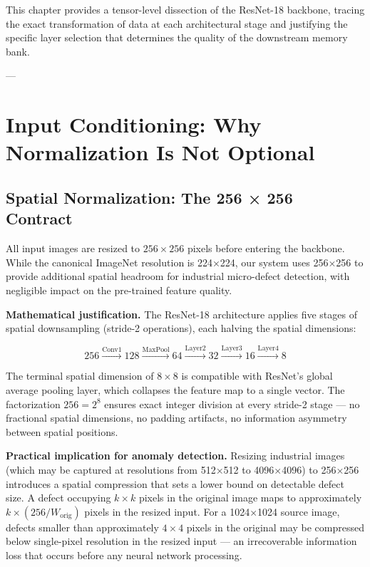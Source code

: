 \documentclass[12pt,a4paper,oneside]{report}
\begin{document}
This chapter provides a tensor-level dissection of the ResNet-18 backbone, tracing the exact transformation of data at each architectural stage and justifying the specific layer selection that determines the quality of the downstream memory bank.

---

\section{Input Conditioning: Why Normalization Is Not Optional}

\subsection{Spatial Normalization: The 256 × 256 Contract}

All input images are resized to $256 \times 256$ pixels before entering the backbone. While the canonical ImageNet resolution is 224×224, our system uses 256×256 to provide additional spatial headroom for industrial micro-defect detection, with negligible impact on the pre-trained feature quality.

\textbf{Mathematical justification.} The ResNet-18 architecture applies five stages of spatial downsampling (stride-2 operations), each halving the spatial dimensions:

$$256 \xrightarrow{\text{Conv1}} 128 \xrightarrow{\text{MaxPool}} 64 \xrightarrow{\text{Layer2}} 32 \xrightarrow{\text{Layer3}} 16 \xrightarrow{\text{Layer4}} 8$$

The terminal spatial dimension of $8 \times 8$ is compatible with ResNet's global average pooling layer, which collapses the feature map to a single vector. The factorization $256 = 2^8$ ensures exact integer division at every stride-2 stage --- no fractional spatial dimensions, no padding artifacts, no information asymmetry between spatial positions.

\textbf{Practical implication for anomaly detection.} Resizing industrial images (which may be captured at resolutions from 512×512 to 4096×4096) to 256×256 introduces a spatial compression that sets a lower bound on detectable defect size. A defect occupying $k \times k$ pixels in the original image maps to approximately $k \times (256/W_{\text{orig}})$ pixels in the resized input. For a 1024×1024 source image, defects smaller than approximately $4 \times 4$ pixels in the original may be compressed below single-pixel resolution in the resized input --- an irrecoverable information loss that occurs before any neural network processing.
\end{document}
